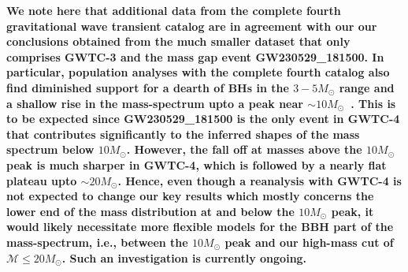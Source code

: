 \documentclass[modern]{aastex631}
\begin{document}

%



\textbf{We note here that additional data from the complete fourth gravitational wave transient catalog \citep[GWTC-4, ][which was publicly unavailable at the time of submission]{LIGOScientific:2025slb} are in agreement with our our conclusions obtained from the much smaller dataset that only comprises GWTC-3 and the mass gap event GW230529\_181500. In particular, population analyses with the complete fourth catalog also find diminished support for a dearth of BHs in the $3-5M_{\odot}$ range and a shallow rise in the mass-spectrum upto a peak near $\sim10M_{\odot}$~\citep{LIGOScientific:2025pvj}. This is to be expected since GW230529\_181500 is the only event in GWTC-4 that contributes significantly to the inferred shapes of the mass spectrum below $10M_{\odot}$. However, the fall off at masses above the $10M_{\odot}$ peak is much sharper in GWTC-4, which is followed by a nearly flat plateau upto $\sim20M_{\odot}$\citep{LIGOScientific:2025pvj}. Hence, even though a reanalysis with GWTC-4 is not expected to change our key results which mostly concerns the lower end of the mass distribution at and below the $10M_{\odot}$ peak, it would likely necessitate more flexible models for the BBH part of the mass-spectrum, i.e., between the $10M_{\odot}$ peak and our high-mass cut of $\mathcal{M}\leq20M_{\odot}$. Such an investigation is currently ongoing.}
\end{document}
